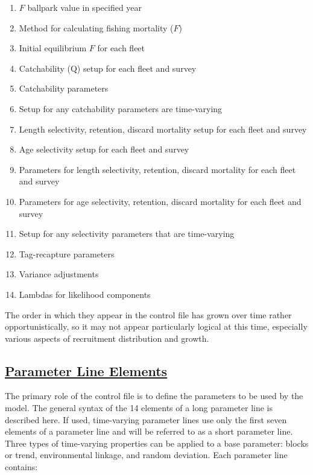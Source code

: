 \begin{enumerate}
		\item $F$ ballpark value in specified year
		\item Method for calculating fishing mortality ($F$)
		\item Initial equilibrium $F$ for each fleet
		\\
		\item Catchability (Q) setup for each fleet and survey
		\item Catchability parameters
		\item Setup for any catchability parameters are time-varying
		\\
		\item Length selectivity, retention, discard mortality setup for each fleet and survey
		\item Age selectivity setup for each fleet and survey
		\item Parameters for length selectivity, retention, discard mortality for each fleet and survey
		\item Parameters for age selectivity, retention, discard mortality for each fleet and survey
		\item Setup for any selectivity parameters that are time-varying
		\\
		\item Tag-recapture parameters
		\\
		\item Variance adjustments
		\item Lambdas for likelihood components
	\end{enumerate}
The order in which they appear in the control file has grown over time rather opportunistically, so it may not appear particularly logical at this time, especially various aspects of recruitment distribution and growth. 

\hypertarget{ParameterLine}{}
\subsection[Parameter Line Elements]{\protect\hyperlink{ParameterLine}{Parameter Line Elements}}
The primary role of the control file is to define the parameters to be used by the model. The general syntax of the 14 elements of a long parameter line is described here. If used, time-varying parameter lines use only the first seven elements of a parameter line and will be referred to as a short parameter line. Three types of time-varying properties can be applied to a base parameter: blocks or trend, environmental linkage, and random deviation. Each parameter line contains:

